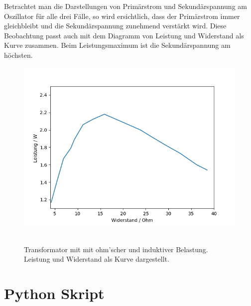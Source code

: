 \documentclass{article}
\begin{document}
Betrachtet man die Darstellungen von Primärstrom und Sekundärspannung am Oszillator für alle drei Fälle, so wird ersichtlich, dass der Primärstrom immer gleichbleibt und die Sekundärspannung zunehmend verstärkt wird.
Diese Beobachtung passt auch mit dem Diagramm von Leistung und Widerstand als Kurve zusammen. Beim Leistungsmaximum ist die Sekundärspannung am höchsten.



\begin{figure}[H]
\caption{Transformator mit mit ohm'scher und induktiver Belastung. Leistung und Widerstand als Kurve dargestellt.}
\label{fig:task4}
{\centering
\includegraphics[scale=0.7]{kurve.png}
~
}
\end{figure}






\appendix
\section{Python Skript}





\end{document}
